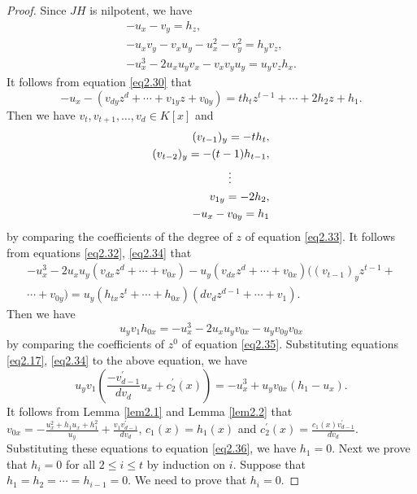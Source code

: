 \documentclass[12pt, twoside, leqno]{article}
\theoremstyle{definition}
\numberwithin{equation}{section}
\begin{document}
\begin{proof}
Since $JH$ is nilpotent, we have
\begin{eqnarray}
-u_{x}-v_{y}=h_{z},\label{eq2.30}\\
-u_{x}v_{y}-v_{x}u_{y}-u_{x}^{2}-v_{y}^{2}=h_{y}v_{z},\label{eq2.31}\\
-u_{x}^{3}-2u_{x}u_{y}v_{x}-v_{x}v_{y}u_{y}=u_{y}v_{z}h_{x}.\label{eq2.32}
\end{eqnarray}
It follows from equation \eqref{eq2.30} that
\begin{equation}\label{eq2.33}
-u_{x}-(v_{dy}z^{d}+\cdots+v_{1y}z+v_{0y})=th_{t}z^{t-1}+\cdots+2h_{2}z+h_{1}.
\end{equation}
Then we have $v_t,v_{t+1},\ldots,v_d\in K[x]$ and
\begin{eqnarray}
(v_{t-1})_y=-th_{t},\notag\\
	(v_{t-2})_y=-(t-1)h_{t-1},\notag\\
	\vdots~~~~~~~~~~\label{eq2.34}\\
	v_{1y}=-2h_{2},\notag\\
	-u_{x}-v_{0y}=h_{1}\notag
\end{eqnarray}
by comparing the coefficients of the degree of $z$ of equation \eqref{eq2.33}. It follows from equations \eqref{eq2.32}, \eqref{eq2.34} that
\begin{equation}\label{eq2.35}
\begin{split}
-u_{x}^{3}-2u_{x}u_{y}(v_{dx}z^{d}+\cdots+v_{0x})-u_{y}(v_{dx}z^{d}+\cdots+v_{0x})( (v_{t-1})_yz^{t-1}+\\\cdots+v_{0y})
	=u_{y}(h_{tx}z^{t}+\cdots+h_{0x})(dv_{d}z^{d-1}+\cdots+v_{1}).
\end{split}
\end{equation}
Then we have
$$u_{y}v_{1}h_{0x}=-u_{x}^{3}-2u_{x}u_{y}v_{0x}-u_{y}v_{0y}v_{0x}$$
by comparing the coefficients of $z^0$ of equation \eqref{eq2.35}. Substituting equations \eqref{eq2.17}, \eqref{eq2.34} to the above equation, we have
\begin{equation}\label{eq2.36}
u_{y}v_{1}\left( \frac{-v_{d-1}^{'}}{dv_{d}}u_{x}+c^{'}_{2}(x)\right) =-u_{x}^{3}+u_{y}v_{0x}(h_{1}-u_{x}).
\end{equation}
It follows from Lemma \ref{lem2.1} and Lemma \ref{lem2.2} that $v_{0x}=-\frac{u_{x}^{2}+h_{1}u_{x}+h_{1}^{2}}{u_{y}}+\frac{v_{1}v_{d-1}^{'}}{dv_{d}}$, $c_1(x)=h_1(x)$ and $c_{2}^{'}(x)=\frac{c_{1}(x)v_{d-1}^{'}}{dv_{d}}$. Substituting these equations to equation \eqref{eq2.36}, we have $h_1=0$. Next we prove that $h_i=0$ for all $2\leq i\leq t$ by induction on $i$.
Suppose that $h_1=h_2=\cdots=h_{i-1}=0$. We need to prove that $h_i=0$.


\end{proof}
\end{document}
